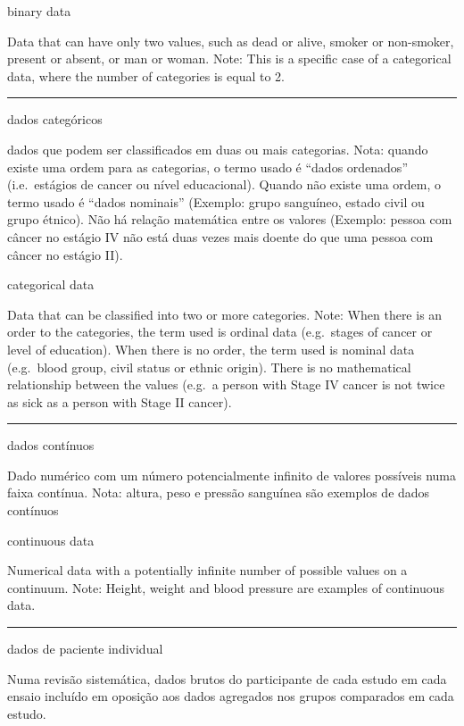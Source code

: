 \documentclass[
]{book}
\begin{document}
binary data

Data that can have only two values, such as dead or alive, smoker or non-smoker, present or absent, or man or woman. Note: This is a specific case of a categorical data, where the number of categories is equal to 2.

\begin{center}\rule{0.5\linewidth}{0.5pt}\end{center}

dados categóricos

dados que podem ser classificados em duas ou mais categorias. Nota: quando existe uma ordem para as categorias, o termo usado é ``dados ordenados'' (i.e.~estágios de cancer ou nível educacional). Quando não existe uma ordem, o termo usado é ``dados nominais'' (Exemplo: grupo sanguíneo, estado civil ou grupo étnico). Não há relação matemática entre os valores (Exemplo: pessoa com câncer no estágio IV não está duas vezes mais doente do que uma pessoa com câncer no estágio II).

categorical data

Data that can be classified into two or more categories. Note: When there is an order to the categories, the term used is ordinal data (e.g.~stages of cancer or level of education). When there is no order, the term used is nominal data (e.g.~blood group, civil status or ethnic origin). There is no mathematical relationship between the values (e.g.~a person with Stage IV cancer is not twice as sick as a person with Stage II cancer).

\begin{center}\rule{0.5\linewidth}{0.5pt}\end{center}

dados contínuos

Dado numérico com um número potencialmente infinito de valores possíveis numa faixa contínua. Nota: altura, peso e pressão sanguínea são exemplos de dados contínuos

continuous data

Numerical data with a potentially infinite number of possible values on a continuum. Note: Height, weight and blood pressure are examples of continuous data.

\begin{center}\rule{0.5\linewidth}{0.5pt}\end{center}

dados de paciente individual

Numa revisão sistemática, dados brutos do participante de cada estudo em cada ensaio incluído em oposição aos dados agregados nos grupos comparados em cada estudo.
\end{document}
